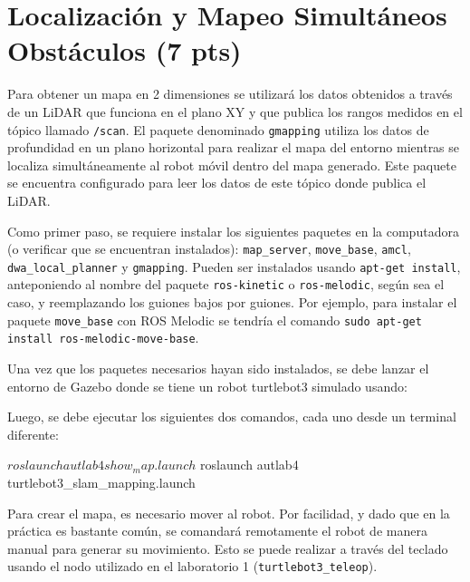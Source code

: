\documentclass[a4paper,11pt]{robotlabs}
\begin{document}
\section{Localización y Mapeo Simultáneos Obstáculos (7 pts)}

Para obtener un mapa en 2 dimensiones se utilizará los datos obtenidos a través
de un LiDAR que funciona en el plano XY y que publica los rangos medidos en el
tópico llamado \texttt{/scan}. El paquete denominado \texttt{gmapping} utiliza
los datos de profundidad en un plano horizontal para realizar el mapa del
entorno mientras se localiza simultáneamente al robot móvil dentro del mapa
generado. Este paquete se encuentra configurado para leer los datos de este
tópico donde publica el LiDAR.

Como primer paso, se requiere instalar los siguientes paquetes en la
computadora (o verificar que se encuentran instalados): \texttt{map\_server},
\texttt{move\_base}, \texttt{amcl}, \texttt{dwa\_local\_planner} y
\texttt{gmapping}. Pueden ser instalados usando \texttt{apt-get install},
anteponiendo al nombre del paquete \texttt{ros-kinetic} o \texttt{ros-melodic},
según sea el caso, y reemplazando los guiones bajos por guiones. Por ejemplo,
para instalar el paquete \texttt{move\_base} con ROS Melodic se tendría el
comando \texttt{sudo apt-get install ros-melodic-move-base}.

Una vez que los paquetes necesarios hayan sido instalados, se debe lanzar el
entorno de Gazebo donde se tiene un robot turtlebot3 simulado usando:
\noindent Luego, se debe ejecutar los siguientes dos comandos, cada uno desde
un terminal diferente:
\begin{listingshell}
$ roslaunch autlab4 show_map.launch 
$ roslaunch autlab4 turtlebot3_slam_mapping.launch 
\end{listingshell}
\noindent Para crear el mapa, es necesario mover al robot. Por facilidad, y
dado que en la práctica es bastante común, se comandará remotamente el robot de
manera manual para generar su movimiento. Esto se puede realizar a través del
teclado usando el nodo utilizado en el laboratorio 1
(\texttt{turtlebot3\_teleop}).
\end{document}
